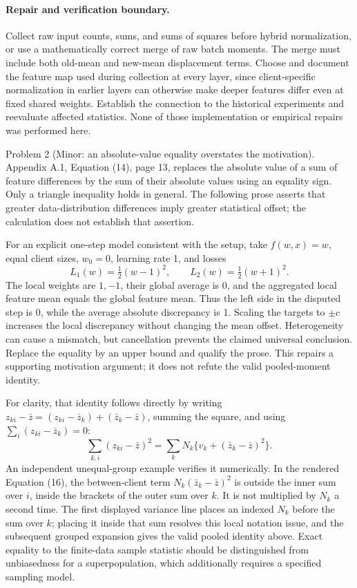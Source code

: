 \documentclass[10pt]{article}
\begin{document}
\paragraph*{Repair and verification boundary.}\mbox{}\par
Collect raw input counts, sums, and sums of squares before hybrid normalization, or use a mathematically correct merge of raw batch moments. The merge must include both old-mean and new-mean displacement terms. Choose and document the feature map used during collection at every layer, since client-specific normalization in earlier layers can otherwise make deeper features differ even at fixed shared weights. Establish the connection to the historical experiments and reevaluate affected statistics. None of those implementation or empirical repairs was performed here.\par
Problem 2 (Minor: an absolute-value equality overstates the motivation).  Appendix A.1, Equation (14), page 13, replaces the absolute value of a sum of feature differences by the sum of their absolute values using an equality sign. Only a triangle inequality holds in general. The following prose asserts that greater data-distribution differences imply greater statistical offset; the calculation does not establish that assertion.\par
For an explicit one-step model consistent with the setup, take \(f(w,x)=w\), equal client sizes, \(w_0=0\), learning rate 1, and losses \[L_1(w)=\tfrac12(w-1)^2,\qquad L_2(w)=\tfrac12(w+1)^2.\] The local weights are \(1,-1\), their global average is 0, and the aggregated local feature mean equals the global feature mean. Thus the left side in the disputed step is 0, while the average absolute discrepancy is 1. Scaling the targets to \(\pm c\) increases the local discrepancy without changing the mean offset. Heterogeneity can cause a mismatch, but cancellation prevents the claimed universal conclusion. Replace the equality by an upper bound and qualify the prose. This repairs a supporting motivation argument; it does not refute the valid pooled-moment identity.\par
For clarity, that identity follows directly by writing \(z_{ki}-\bar z=(z_{ki}-\bar z_k)+(\bar z_k-\bar z)\), summing the square, and using \(\sum_i(z_{ki}-\bar z_k)=0\): \[\sum_{k,i}(z_{ki}-\bar z)^2
 =\sum_kN_k\{v_k+(\bar z_k-\bar z)^2\}.\] An independent unequal-group example verifies it numerically. In the rendered Equation (16), the between-client term \(N_k(\bar z_k-\bar z)^2\) is outside the inner sum over \(i\), inside the brackets of the outer sum over \(k\). It is not multiplied by \(N_k\) a second time. The first displayed variance line places an indexed \(N_k\) before the sum over \(k\); placing it inside that sum resolves this local notation issue, and the subsequent grouped expansion gives the valid pooled identity above. Exact equality to the finite-data sample statistic should be distinguished from unbiasedness for a superpopulation, which additionally requires a specified sampling model.\par
\end{document}
